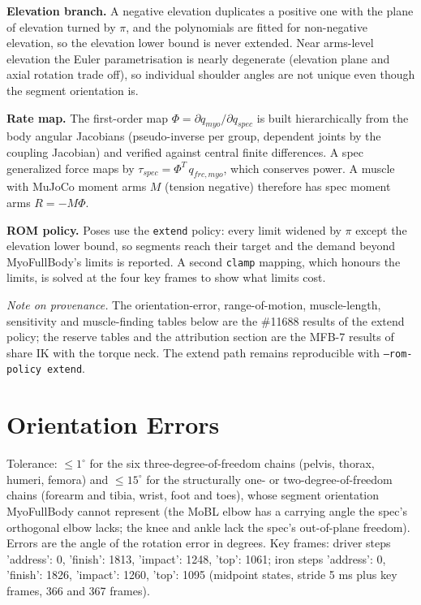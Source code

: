 \documentclass[11pt,a4paper]{article}
\begin{document}
\textbf{Elevation branch.} A negative elevation duplicates a positive one with the plane of elevation turned by $\pi$, and the polynomials are fitted for non-negative elevation, so the elevation lower bound is never extended. Near arms-level elevation the Euler parametrisation is nearly degenerate (elevation plane and axial rotation trade off), so individual shoulder angles are not unique even though the segment orientation is.

\textbf{Rate map.} The first-order map $\Phi=\partial q_{myo}/\partial q_{spec}$ is built hierarchically from the body angular Jacobians (pseudo-inverse per group, dependent joints by the coupling Jacobian) and verified against central finite differences. A spec generalized force maps by $\tau_{spec}=\Phi^T\,q_{frc,myo}$, which conserves power. A muscle with MuJoCo moment arms $M$ (tension negative) therefore has spec moment arms $R=-M\Phi$.

\textbf{ROM policy.} Poses use the \texttt{extend} policy: every limit widened by $\pi$ except the elevation lower bound, so segments reach their target and the demand beyond MyoFullBody's limits is reported. A second \texttt{clamp} mapping, which honours the limits, is solved at the four key frames to show what limits cost.

\noindent\emph{Note on provenance.} The orientation-error, range-of-motion, muscle-length, sensitivity and muscle-finding tables below are the \#11688 results of the extend policy; the reserve tables and the attribution section are the MFB-7 results of share IK with the torque neck. The extend path remains reproducible with \texttt{--rom-policy extend}.

\section{Orientation Errors}
Tolerance: $\le 1^\circ$ for the six three-degree-of-freedom chains (pelvis, thorax, humeri, femora) and $\le 15^\circ$ for the structurally one- or two-degree-of-freedom chains (forearm and tibia, wrist, foot and toes), whose segment orientation MyoFullBody cannot represent (the MoBL elbow has a carrying angle the spec's orthogonal elbow lacks; the knee and ankle lack the spec's out-of-plane freedom). Errors are the angle of the rotation error in degrees. Key frames: driver steps {'address': 0, 'finish': 1813, 'impact': 1248, 'top': 1061}; iron steps {'address': 0, 'finish': 1826, 'impact': 1260, 'top': 1095} (midpoint states, stride 5 ms plus key frames, 366 and 367 frames).
\end{document}
